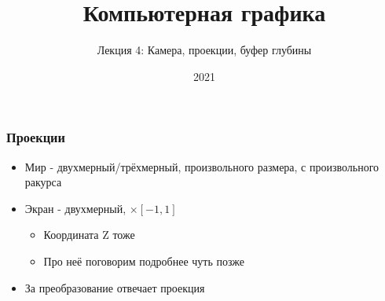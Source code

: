 \documentclass{beamer}
\title{Компьютерная графика}
\subtitle{Лекция 4: Камера, проекции, буфер глубины}
\date{2021}
\begin{document}
\frame{\titlepage}

\begin{frame}[fragile]
\frametitle{Проекции}
\begin{itemize}
\item Мир - двухмерный/трёхмерный, произвольного размера, с произвольного ракурса
\pause
\item Экран - двухмерный, \begin{math}[-1, 1] \times [-1, 1]\end{math}
\pause
\begin{itemize}
\item Координата Z тоже \begin{math}[-1, 1]\end{math}
\item Про неё поговорим подробнее чуть позже
\end{itemize}
\pause
\item За преобразование отвечает проекция
\end{itemize}
\end{frame}
\end{document}
